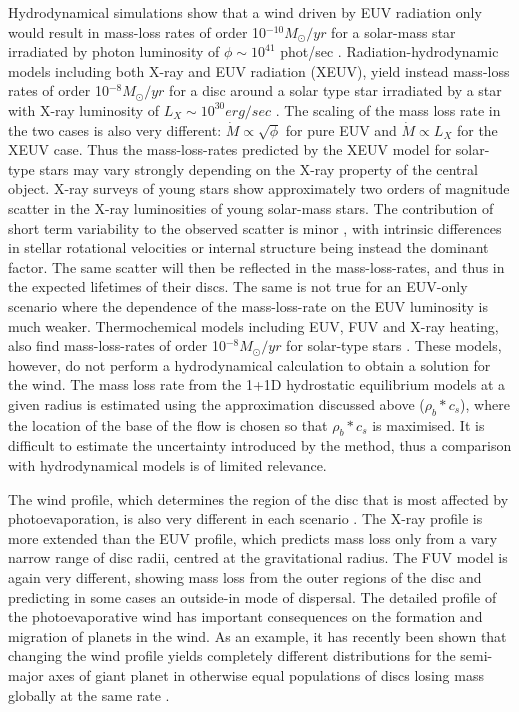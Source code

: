 \documentclass{rsos}
\begin{document}
Hydrodynamical simulations show that a wind driven by EUV radiation only would result in mass-loss rates of order 10$^{-10} M_{\odot}/yr$ for a solar-mass star irradiated by photon luminosity of $\phi \sim 10^{41}$ phot/sec \cite{2006MNRAS.369..229A}. Radiation-hydrodynamic models including both X-ray and EUV radiation (XEUV),  yield instead mass-loss rates of order 10$^{-8} M_{\odot}/yr$ for a disc around a solar type star irradiated by a star with X-ray luminosity of $L_X \sim 10^{30} erg/sec$ \cite{2010MNRAS.401.1415O, 2011MNRAS.412...13O, 2012MNRAS.422.1880O}. The scaling of the mass loss rate in the two cases is also very different: $\dot M \propto \sqrt{\phi}$ for pure EUV and $\dot M \propto L_X$ for the XEUV case. Thus the mass-loss-rates predicted by the XEUV model for solar-type stars may vary strongly depending on the X-ray property of the central object. X-ray surveys of young stars show approximately two orders of magnitude scatter in the X-ray luminosities of young solar-mass stars. The contribution of short term variability to the observed scatter is minor \cite{2005ApJS..160..390P}, with intrinsic differences in stellar rotational velocities or internal structure being instead the dominant factor. The same scatter will then be reflected in the mass-loss-rates, and thus in the expected lifetimes of their discs. The same is not true for an EUV-only scenario where the dependence of the mass-loss-rate on the EUV luminosity is much weaker. Thermochemical models including EUV, FUV and X-ray heating, also find mass-loss-rates of order 10$^{-8} M_{\odot}/yr$ for solar-type stars  \cite{2009ApJ...705.1237G}. 
These models, however, do not perform a hydrodynamical calculation to obtain a solution for the wind. The mass loss rate from the 1+1D hydrostatic equilibrium models at a given radius is estimated using the approximation discussed above ($\rho_b*c_s$), where the location of the base of the flow is chosen so that $\rho_b*c_s$ is maximised. It is difficult to estimate the uncertainty introduced by the method, thus a comparison with hydrodynamical models  \cite{2006MNRAS.369..229A, 2010MNRAS.401.1415O, 2011MNRAS.412...13O, 2012MNRAS.422.1880O} is of limited relevance.

The wind profile, which determines the region of the disc that is most affected by photoevaporation, is also very different in each scenario 
\cite{2011ARA&A..49..195A, 2014prpl.conf..475A}. The X-ray profile is more extended than the EUV profile, which predicts mass loss only from a vary narrow range of disc radii, centred at the gravitational radius. The FUV model is again very different, showing mass loss from the outer regions of the disc and predicting in some cases an outside-in mode of dispersal. 
The detailed profile of the photoevaporative wind has important consequences on the formation and migration of planets in the wind. As an example, it has recently been shown that changing the wind profile yields completely different distributions for the semi-major axes of giant planet in otherwise equal populations of discs losing mass globally at the same rate \cite{2015MNRAS.450.3008E}. 
\end{document}
